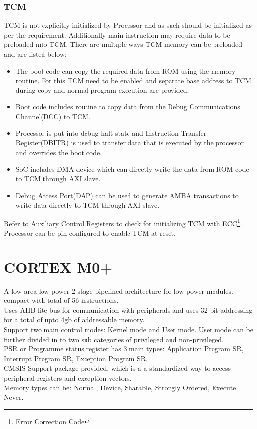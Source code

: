 \subsubsection{TCM}
TCM is not explicitly initialized by Processor and as such should be initialized as per the requirement.
Additionally main instruction may require data to be preloaded into TCM. There are multiple ways TCM memory can be preloaded and are listed below:
\begin{itemize}
	\item The boot code can copy the required data from ROM using the memory routine. For this TCM need to be enabled and separate base address to TCM during copy and normal program execution are provided.
	\item Boot code includes routine to copy data from the Debug Communications Channel(DCC) to TCM.
	\item Processor is put into debug halt state and Instruction Transfer Register(DBITR) is used to transfer data that is executed by the processor and overrides the boot code.
	\item SoC includes DMA device which can directly write the data from ROM code to TCM through AXI slave.
	\item Debug Access Port(DAP) can be used to generate AMBA transactions to write data directly to TCM through AXI slave.
\end{itemize}
Refer to Auxiliary Control Registers to check for initializing TCM with ECC\footnote{Error Correction Code}.
Processor can be pin configured to enable TCM at reset.
\section{CORTEX M0+}
A low area low power 2 stage pipelined architecture for low power modules.\\
compact with total of 56 instructions.\\
Uses AHB lite bus for communication with peripherals and uses 32 bit addressing for a total of upto 4gb of addressable memory.\\
Support two main control modes: Kernel mode and User mode.
User mode can be further divided in to two sub categories of privileged and non-privileged.\\
PSR or Programme status register has 3 main types: Application Program SR, Interrupt Program SR, Exception Program SR.\\
CMSIS Support package provided, which is a a standardized way to access peripheral registers and exception vectors.\\
Memory types can be: Normal, Device, Sharable, Strongly Ordered, Execute Never.\\

